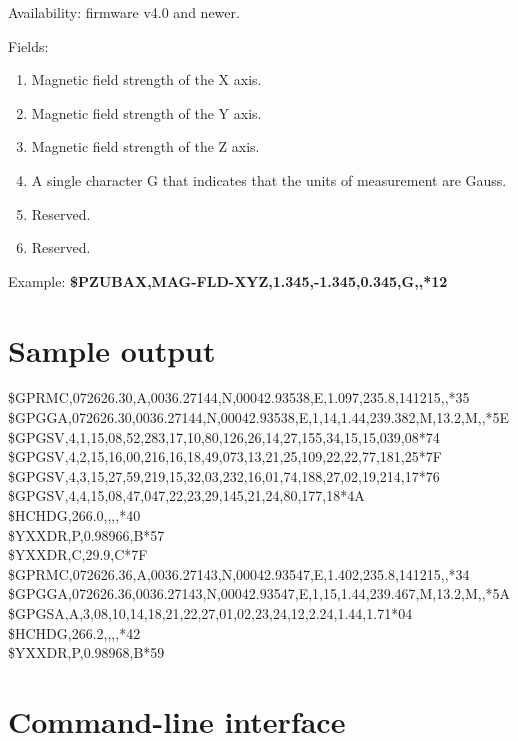 \documentclass{zubaxdoc}
\begin{document}
Availability: firmware v4.0 and newer.

Fields: 
\begin{enumerate}
\item Magnetic field strength of the X axis.
\item Magnetic field strength of the Y axis.
\item Magnetic field strength of the Z axis.
\item A single character G that indicates that the units of measurement are Gauss.
\item Reserved.
\item Reserved.
\end{enumerate}
Example: \textbf{{\$}PZUBAX,MAG-FLD-XYZ,1.345,-1.345,0.345,G,,*12}

\section{Sample output}
\$GPRMC,072626.30,A,0036.27144,N,00042.93538,E,1.097,235.8,141215,,*35\\
\$GPGGA,072626.30,0036.27144,N,00042.93538,E,1,14,1.44,239.382,M,13.2,M,,*5E\\
\$GPGSV,4,1,15,08,52,283,17,10,80,126,26,14,27,155,34,15,15,039,08*74\\
\$GPGSV,4,2,15,16,00,216,16,18,49,073,13,21,25,109,22,22,77,181,25*7F\\
\$GPGSV,4,3,15,27,59,219,15,32,03,232,16,01,74,188,27,02,19,214,17*76\\
\$GPGSV,4,4,15,08,47,047,22,23,29,145,21,24,80,177,18*4A\\
\$HCHDG,266.0,,,,*40\\
\$YXXDR,P,0.98966,B*57\\
\$YXXDR,C,29.9,C*7F\\
\$GPRMC,072626.36,A,0036.27143,N,00042.93547,E,1.402,235.8,141215,,*34\\
\$GPGGA,072626.36,0036.27143,N,00042.93547,E,1,15,1.44,239.467,M,13.2,M,,*5A\\
\$GPGSA,A,3,08,10,14,18,21,22,27,01,02,23,24,12,2.24,1.44,1.71*04\\
\$HCHDG,266.2,,,,*42\\
\$YXXDR,P,0.98968,B*59\\

\clearpage
\section{Command-line interface}
\end{document}
